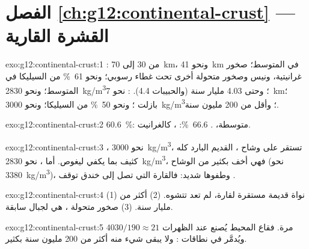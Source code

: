 \section*{الفصل \ref{ch:g12:continental-crust} --- القشرة القارية}

\begin{solution}{exo:g12:continental-crust:1}
: من 30 إلى \qty{70}{km}، ونحو \qty{41}{km} في المتوسط؛
صخور غرانيتية، ونيس وصخور متحولة  أخرى تحت
غطاء رسوبي؛ ونحو \qty{61}{\percent} من السيليكا في المتوسط؛ ونحو
\qty{2830}{kg/m^3}؛ وحتى 4.03 مليار سنة (والحبيبات 4.4). :
نحو \qty{7}{km}؛ بازلت ؛ ونحو \qty{50}{\percent} من السيليكا؛ ونحو
\qty{3000}{kg/m^3}؛ وأقل من 200 مليون سنة.
\end{solution}

\begin{solution}{exo:g12:continental-crust:2}
\qty{60.6}{\percent}: متوسطة، . \qty{66.6}{\percent}:
، كالغرانيت.
\end{solution}

\begin{solution}{exo:g12:continental-crust:3}
، نحو \qty{3000}{kg/m^3}، تستقر على وشاح ،
 القديم البارد كله كثيف بما يكفي ليغوص.
أما ، نحو \qty{2830}{kg/m^3}، فهي أخف بكثير من الوشاح
(نحو \qty{3380}{kg/m^3})، وطفوها شديد: فالقارة التي تصل إلى خندق
توقف .
\end{solution}

\begin{solution}{exo:g12:continental-crust:4}
(1) نواة قديمة مستقرة لقارة، لم تعد تتشوه. (2) أكثر
من مليار سنة. (3) صخور متحولة ، هي 
لجبال سابقة.
\end{solution}

\begin{solution}{exo:g12:continental-crust:5}
$4030/190 \approx 21$ مرة. فقاع المحيط يُصنع عند الظهرات
ويُدمَّر في نطاقات : ولا يبقى شيء منه أكثر من 200 مليون
سنة بكثير.
\end{solution}

